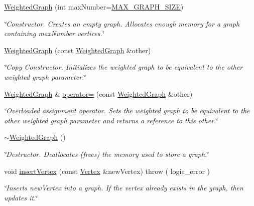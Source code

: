 \begin{DoxyCompactItemize}
\item 
\hyperlink{class_weighted_graph_a9255d382e53db8d520ef1e2b63814c81}{Weighted\+Graph} (int max\+Number=\hyperlink{class_weighted_graph_af9b34017e5b494cd3aca2dbc8335fc3c}{M\+A\+X\+\_\+\+G\+R\+A\+P\+H\+\_\+\+S\+I\+ZE})
\begin{DoxyCompactList}\small\item\em \char`\"{}\+Constructor. Creates an empty graph. Allocates enough memory for a graph containing max\+Number vertices.\char`\"{} \end{DoxyCompactList}\item 
\hyperlink{class_weighted_graph_a294fd717db213e761dc0eb65bbfcb7ab}{Weighted\+Graph} (const \hyperlink{class_weighted_graph}{Weighted\+Graph} \&other)
\begin{DoxyCompactList}\small\item\em \char`\"{}\+Copy Constructor. Initializes the weighted graph to be equivalent to the other weighted graph parameter.\char`\"{} \end{DoxyCompactList}\item 
\hyperlink{class_weighted_graph}{Weighted\+Graph} \& \hyperlink{class_weighted_graph_aa5982a507e944af28e4749cdc06543c6}{operator=} (const \hyperlink{class_weighted_graph}{Weighted\+Graph} \&other)
\begin{DoxyCompactList}\small\item\em \char`\"{}\+Overloaded assignment operator. Sets the weighted graph to be equivalent to the other weighted graph parameter and returns a reference to this other.\char`\"{} \end{DoxyCompactList}\item 
\hyperlink{class_weighted_graph_ad7b4a5c8206772f9f4fb5906c0d64923}{$\sim$\+Weighted\+Graph} ()
\begin{DoxyCompactList}\small\item\em \char`\"{}\+Destructor. Deallocates (frees) the memory used to store a graph.\char`\"{} \end{DoxyCompactList}\item 
void \hyperlink{class_weighted_graph_aec4ef3455e3cc0d73a42e042adb7ac40}{insert\+Vertex} (const \hyperlink{class_weighted_graph_1_1_vertex}{Vertex} \&new\+Vertex)  throw ( logic\+\_\+error )
\begin{DoxyCompactList}\small\item\em \char`\"{}\+Inserts new\+Vertex into a graph. If the vertex already exists in the graph, then updates it.\char`\"{} \end{DoxyCompactList}\item 

\end{DoxyCompactItemize}
